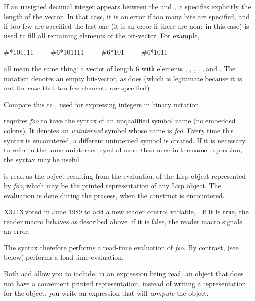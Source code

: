 \begin{flushdesc}
If an unsigned decimal integer appears between the \cd{\#} and \cdf{*},
it specifies explicitly the length of the vector.  In that case,
it is an error if too many bits are specified,
and if too few are specified the last one
(it is an error if there are none in this case)
is used to fill all remaining elements of the bit-vector.
For example,
\begin{lisp}
\#*101111~~~~~\#6*101111~~~~~\#6*101~~~~~\#6*1011
\end{lisp}
all mean the same thing: a vector of length 6 with elements , ,
, , , and .
The notation \cd{\#*} denotes an empty bit-vector, as does 
(which is legitimate because it is not the case that too few elements
are specified).
\begin{new}
Compare this to , used for expressing integers in binary notation.
\end{new}

\item[\cd{\#:}]
 requires \emph{foo} to have the syntax of an unqualified
symbol name (no embedded colons).  It denotes an \emph{uninterned} symbol
whose name is \emph{foo}.  Every time this syntax is encountered, a different
uninterned symbol is created.  If it is necessary to refer to the
same uninterned symbol more than once in the same expression,
the \cd{\#=} syntax may be useful.

\item[\cd{\#.}]
 is read as the object resulting from the evaluation
of the Lisp object represented by \emph{foo},
which may be the printed representation of any Lisp object.
The evaluation is done during the  process, when the 
construct is encountered.

\begin{newer}
X3J13 voted in June 1989  to add a new reader control variable,
.  If it is true,
the  reader macro behaves as described above;
if it is false, the  reader macro signals an error.
\end{newer}

The  syntax therefore performs a read-time evaluation of \emph{foo}.
By contrast, \cd{\#,} (see below) performs a load-time evaluation.

Both  and \cd{\#,} allow you to include, in an expression
being read, an object that does not have a convenient printed
representation; instead of writing a representation for the object,
you write an expression that will \emph{compute} the object.
\end{flushdesc}

